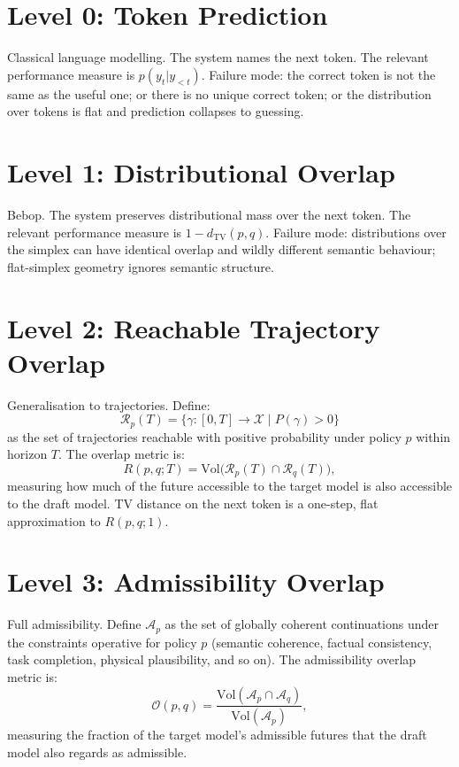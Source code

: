 \documentclass[11pt, a4paper, openany]{book}
\theoremstyle{plain}
\theoremstyle{definition}
\theoremstyle{remark}
\newcommand{\TV}{d_{\mathrm{TV}}}
\newcommand{\Ap}{\mathcal{A}_p}
\newcommand{\Aq}{\mathcal{A}_q}
\newcommand{\Vol}{\mathrm{Vol}}
\begin{document}
\section{Level 0: Token Prediction}

Classical language modelling.
The system names the next token.
The relevant performance measure is $p(y_t | y_{<t})$.
Failure mode: the correct token is not the same as the useful one;
or there is no unique correct token; or the distribution over tokens
is flat and prediction collapses to guessing.

\section{Level 1: Distributional Overlap}

Bebop.
The system preserves distributional mass over the next token.
The relevant performance measure is $1 - \TV(p, q)$.
Failure mode: distributions over the simplex can have identical overlap
and wildly different semantic behaviour; flat-simplex geometry ignores
semantic structure.

\section{Level 2: Reachable Trajectory Overlap}

Generalisation to trajectories.
Define:
\begin{equation}
  \mathcal{R}_p(T) = \bigl\{\gamma : [0,T] \to \mathcal{X} \;\big|\;
  P(\gamma) > 0 \bigr\}
  \label{eq:reachable}
\end{equation}
as the set of trajectories reachable with positive probability under policy $p$
within horizon $T$.
The overlap metric is:
\[
  R(p,q;T) = \Vol\!\bigl(\mathcal{R}_p(T) \cap \mathcal{R}_q(T)\bigr),
\]
measuring how much of the future accessible to the target model is also
accessible to the draft model.
TV distance on the next token is a one-step, flat approximation to $R(p,q;1)$.

\section{Level 3: Admissibility Overlap}

Full admissibility.
Define $\Ap$ as the set of globally coherent continuations under the constraints
operative for policy $p$ (semantic coherence, factual consistency, task
completion, physical plausibility, and so on).
The admissibility overlap metric is:
\begin{equation}
  \mathcal{O}(p,q) = \frac{\Vol(\Ap \cap \Aq)}{\Vol(\Ap)},
  \label{eq:admissibility-overlap}
\end{equation}
measuring the fraction of the target model's admissible futures that
the draft model also regards as admissible.
\end{document}
